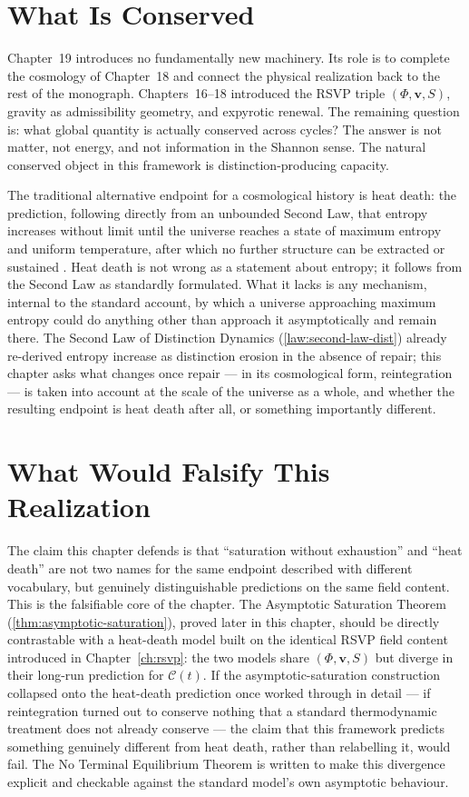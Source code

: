 \documentclass[12pt,twoside,openright]{book}
\begin{document}
\section{What Is Conserved}
\label{sec:ch19-conserved}

Chapter~19 introduces no fundamentally new machinery. Its
role is to complete the cosmology of Chapter~18 and connect
the physical realization back to the rest of the monograph.
Chapters~16--18 introduced the RSVP triple
$(\Phi,\mathbf{v},S)$, gravity as admissibility geometry,
and expyrotic renewal. The remaining question is: what
global quantity is actually conserved across cycles? The
answer is not matter, not energy, and not information in
the Shannon sense. The natural conserved object in this
framework is distinction-producing capacity.

The traditional alternative endpoint for a cosmological
history is heat death: the prediction, following directly
from an unbounded Second Law, that entropy increases without
limit until the universe reaches a state of maximum entropy
and uniform temperature, after which no further structure can
be extracted or sustained \parencite{prigogine1984}. Heat
death is not wrong as a statement about entropy; it follows
from the Second Law as standardly formulated. What it lacks
is any mechanism, internal to the standard account, by which a
universe approaching maximum entropy could do anything other
than approach it asymptotically and remain there. The Second
Law of Distinction Dynamics (\cref{law:second-law-dist})
already re-derived entropy increase as distinction erosion in
the absence of repair; this chapter asks what changes once
repair --- in its cosmological form, reintegration --- is
taken into account at the scale of the universe as a whole,
and whether the resulting endpoint is heat death after all, or
something importantly different.

\section{What Would Falsify This Realization}
\label{sec:ch19-falsifiability}

The claim this chapter defends is that ``saturation without
exhaustion'' and ``heat death'' are not two names for the same
endpoint described with different vocabulary, but genuinely
distinguishable predictions on the same field content. This is
the falsifiable core of the chapter. The Asymptotic Saturation
Theorem (\cref{thm:asymptotic-saturation}), proved later in
this chapter, should be directly contrastable with a
heat-death model built on the identical RSVP field content
introduced in Chapter~\ref{ch:rsvp}: the two models share
$(\Phi,\mathbf{v},S)$ but diverge in their long-run prediction
for $\mathcal{C}(t)$. If the asymptotic-saturation construction
collapsed onto the heat-death prediction once worked through in
detail --- if reintegration turned out to conserve nothing
that a standard thermodynamic treatment does not already
conserve --- the claim that this framework predicts something
genuinely different from heat death, rather than relabelling
it, would fail. The No Terminal Equilibrium Theorem is written
to make this divergence explicit and checkable against the
standard model's own asymptotic behaviour.
\end{document}
